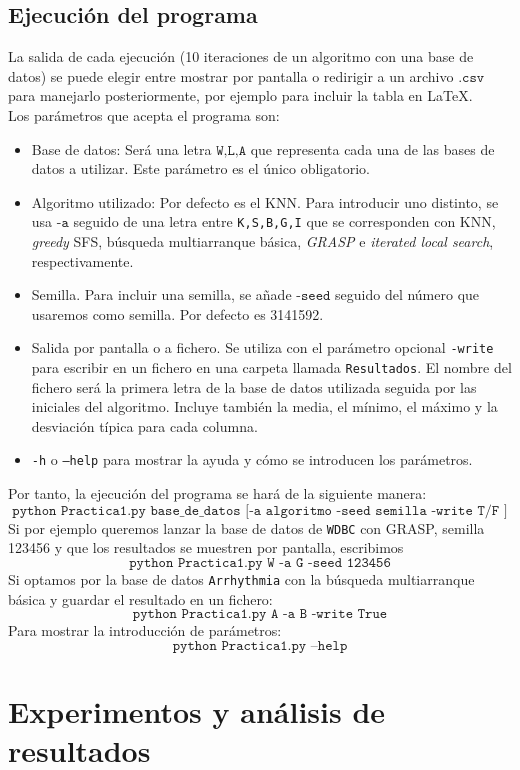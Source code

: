\documentclass[11pt,leqno]{article}
\begin{document}
\subsection{Ejecución del programa}
La salida de cada ejecución (10 iteraciones de un algoritmo con una base de datos) se puede elegir entre mostrar por pantalla o redirigir a un archivo $\texttt{.csv}$ para manejarlo posteriormente, por ejemplo para incluir la tabla en \LaTeX.\\
Los parámetros que acepta el programa son:
\begin{itemize}
\item Base de datos: Será una letra $\texttt{W,L,A}$ que representa cada una de las bases de datos a utilizar. Este parámetro es el único obligatorio.
\item Algoritmo utilizado: Por defecto es el KNN. Para introducir uno distinto, se usa $\texttt{-a}$ seguido de una letra entre \texttt{K,S,B,G,I} que se corresponden con KNN, \textit{greedy} SFS, búsqueda multiarranque básica, \textit{GRASP} e \textit{iterated local search}, respectivamente.
\item Semilla. Para incluir una semilla, se añade $\texttt{-seed}$ seguido del número que usaremos como semilla. Por defecto es 3141592.
\item Salida por pantalla o a fichero. Se utiliza con el parámetro opcional \texttt{-write} para escribir en un fichero en una carpeta llamada \texttt{Resultados}. El nombre del fichero será la primera letra de la base de datos utilizada seguida por las iniciales del algoritmo. Incluye también la media, el mínimo, el máximo y la desviación típica para cada columna.
\item \texttt{-h} o \texttt{--help} para mostrar la ayuda y cómo se introducen los parámetros.
\end{itemize}

Por tanto, la ejecución del programa se hará de la siguiente manera:
\[ \texttt{python Practica1.py base\_de\_datos [-a algoritmo -seed semilla -write T/F ]} \]
Si por ejemplo queremos lanzar la base de datos de \texttt{WDBC} con GRASP, semilla 123456 y que los resultados se muestren por pantalla, escribimos
\[ \texttt{python Practica1.py W -a G -seed 123456}\]
Si optamos por la base de datos \texttt{Arrhythmia} con la búsqueda multiarranque básica y guardar el resultado en un fichero:
\[ \texttt{python Practica1.py A -a B -write True}\]
Para mostrar la introducción de parámetros:
\[ \texttt{python Practica1.py --help}\]

\section{Experimentos y análisis de resultados}
\end{document}
